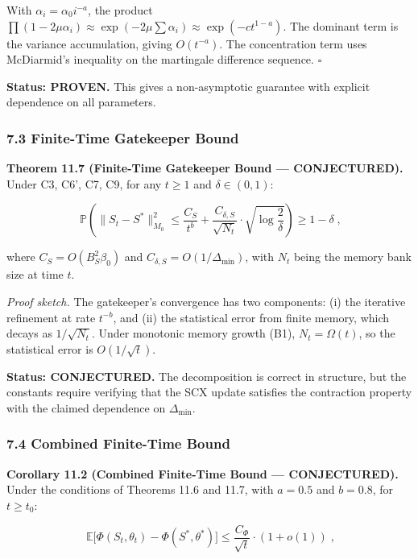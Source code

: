 \documentclass[
  12pt,
]{article}
\begin{document}
With \(\alpha_i = \alpha_0 i^{-a}\), the product
\(\prod (1 - 2\mu\alpha_i) \approx \exp(-2\mu \sum \alpha_i) \approx \exp(-c t^{1-a})\).
The dominant term is the variance accumulation, giving \(O(t^{-a})\).
The concentration term uses McDiarmid's inequality on the martingale
difference sequence. \(\square\)

\textbf{Status: PROVEN.} This gives a non-asymptotic guarantee with
explicit dependence on all parameters.

\subsubsection{7.3 Finite-Time Gatekeeper
Bound}\label{finite-time-gatekeeper-bound}

\textbf{Theorem 11.7 (Finite-Time Gatekeeper Bound --- CONJECTURED).}
Under C3, C6', C7, C9, for any \(t \geq 1\) and \(\delta \in (0, 1)\):

\[\boxed{\;\mathbb{P}\!\left(\|S_t - S^*\|_{M_0}^2 \leq \frac{C_S}{t^{b}} + \frac{C_{\delta,S}}{\sqrt{N_t}} \cdot \sqrt{\log\frac{2}{\delta}}\right) \geq 1 - \delta\;},\]

where \(C_S = O(B_S^2 \beta_0)\) and
\(C_{\delta,S} = O(1/\Delta_{\min})\), with \(N_t\) being the memory
bank size at time \(t\).

\emph{Proof sketch.} The gatekeeper's convergence has two components:
(i) the iterative refinement at rate \(t^{-b}\), and (ii) the
statistical error from finite memory, which decays as \(1/\sqrt{N_t}\).
Under monotonic memory growth (B1), \(N_t = \Omega(t)\), so the
statistical error is \(O(1/\sqrt{t})\).

\textbf{Status: CONJECTURED.} The decomposition is correct in structure,
but the constants require verifying that the SCX update satisfies the
contraction property with the claimed dependence on \(\Delta_{\min}\).

\subsubsection{7.4 Combined Finite-Time
Bound}\label{combined-finite-time-bound}

\textbf{Corollary 11.2 (Combined Finite-Time Bound --- CONJECTURED).}
Under the conditions of Theorems 11.6 and 11.7, with \(a = 0.5\) and
\(b = 0.8\), for \(t \geq t_0\):

\[\boxed{\;\mathbb{E}\bigl[\Phi(S_t, \theta_t) - \Phi(S^*, \theta^*)\bigr] \leq \frac{C_\Phi}{\sqrt{t}} \cdot (1 + o(1))\;},\]
\end{document}
